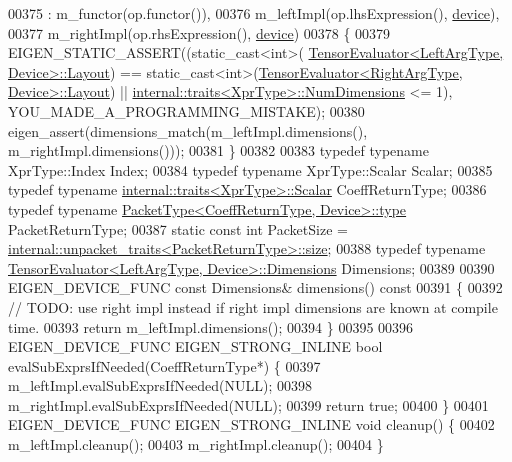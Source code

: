 \begin{DoxyCode}
00375     : m\_functor(op.functor()),
00376       m\_leftImpl(op.lhsExpression(), \hyperlink{struct_eigen_1_1_tensor_evaluator_a98b51809ed8f7a1f736eb7b952b9636e}{device}),
00377       m\_rightImpl(op.rhsExpression(), \hyperlink{struct_eigen_1_1_tensor_evaluator_a98b51809ed8f7a1f736eb7b952b9636e}{device})
00378   \{
00379     EIGEN\_STATIC\_ASSERT((static\_cast<int>(
      \hyperlink{struct_eigen_1_1_tensor_evaluator}{TensorEvaluator<LeftArgType, Device>::Layout}) == 
      static\_cast<int>(\hyperlink{struct_eigen_1_1_tensor_evaluator}{TensorEvaluator<RightArgType, Device>::Layout}) || 
      \hyperlink{struct_eigen_1_1internal_1_1traits}{internal::traits<XprType>::NumDimensions} <= 1), 
      YOU\_MADE\_A\_PROGRAMMING\_MISTAKE);
00380     eigen\_assert(dimensions\_match(m\_leftImpl.dimensions(), m\_rightImpl.dimensions()));
00381   \}
00382 
00383   \textcolor{keyword}{typedef} \textcolor{keyword}{typename} XprType::Index Index;
00384   \textcolor{keyword}{typedef} \textcolor{keyword}{typename} XprType::Scalar Scalar;
00385   \textcolor{keyword}{typedef} \textcolor{keyword}{typename} \hyperlink{struct_eigen_1_1internal_1_1traits}{internal::traits<XprType>::Scalar} CoeffReturnType;
00386   \textcolor{keyword}{typedef} \textcolor{keyword}{typename} \hyperlink{group___sparse_core___module}{PacketType<CoeffReturnType, Device>::type} 
      PacketReturnType;
00387   \textcolor{keyword}{static} \textcolor{keyword}{const} \textcolor{keywordtype}{int} PacketSize = 
      \hyperlink{struct_eigen_1_1internal_1_1unpacket__traits}{internal::unpacket\_traits<PacketReturnType>::size};
00388   \textcolor{keyword}{typedef} \textcolor{keyword}{typename} \hyperlink{struct_eigen_1_1_tensor_evaluator}{TensorEvaluator<LeftArgType, Device>::Dimensions}
       Dimensions;
00389 
00390   EIGEN\_DEVICE\_FUNC \textcolor{keyword}{const} Dimensions& dimensions()\textcolor{keyword}{ const}
00391 \textcolor{keyword}{  }\{
00392     \textcolor{comment}{// TODO: use right impl instead if right impl dimensions are known at compile time.}
00393     \textcolor{keywordflow}{return} m\_leftImpl.dimensions();
00394   \}
00395 
00396   EIGEN\_DEVICE\_FUNC EIGEN\_STRONG\_INLINE \textcolor{keywordtype}{bool} evalSubExprsIfNeeded(CoeffReturnType*) \{
00397     m\_leftImpl.evalSubExprsIfNeeded(NULL);
00398     m\_rightImpl.evalSubExprsIfNeeded(NULL);
00399     \textcolor{keywordflow}{return} \textcolor{keyword}{true};
00400   \}
00401   EIGEN\_DEVICE\_FUNC EIGEN\_STRONG\_INLINE \textcolor{keywordtype}{void} cleanup() \{
00402     m\_leftImpl.cleanup();
00403     m\_rightImpl.cleanup();
00404   \}

\end{DoxyCode}
